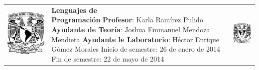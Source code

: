 \documentclass[10pt]{article}
\begin{document}
\begin{center}
\begin{tabular}[h]{c C{10cm} c}
\includegraphics[scale=.2]{cover.png} & 
\textbf{{\Large Lenguajes de \newline Programación}} 
\newline \textbf{Profesor}: Karla Ramírez Pulido 
\newline \textbf{Ayudante de Teoría}: Joshua Emmanuel Mendoza Mendieta 
\newline \textbf{Ayudante le Laboratorio}: Héctor Enrique Gómez Morales
\newline Inicio de semestre: 26 de enero de 2014
\newline Fin de semestre: 22 de mayo de 2014 &
\includegraphics[scale=.4]{cover2.png}
\end{tabular}
\end{center}
\end{document}

